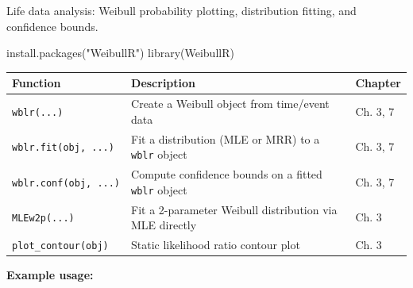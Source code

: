 \documentclass[
  letterpaper,
  DIV=11,
  numbers=noendperiod]{scrreprt}
\newenvironment{Shaded}{\begin{snugshade}}{\end{snugshade}}
\newcommand{\FunctionTok}[1]{\textcolor[rgb]{0.28,0.35,0.67}{#1}}
\newcommand{\NormalTok}[1]{\textcolor[rgb]{0.00,0.23,0.31}{#1}}
\newcommand{\StringTok}[1]{\textcolor[rgb]{0.13,0.47,0.30}{#1}}
\newcounter{none} %
\begin{document}
Life data analysis: Weibull probability plotting, distribution fitting,
and confidence bounds.

\begin{Shaded}
\begin{Highlighting}[]
\FunctionTok{install.packages}\NormalTok{(}\StringTok{"WeibullR"}\NormalTok{)}
\FunctionTok{library}\NormalTok{(WeibullR)}
\end{Highlighting}
\end{Shaded}

{\def\LTcaptype{none} %
\begin{longtable}[]{@{}
  >{\raggedright\arraybackslash}p{}
  >{\raggedright\arraybackslash}p{}
  >{\raggedright\arraybackslash}p{}@{}}
\toprule\noalign{}
\begin{minipage}[b]{\linewidth}\raggedright
Function
\end{minipage} & \begin{minipage}[b]{\linewidth}\raggedright
Description
\end{minipage} & \begin{minipage}[b]{\linewidth}\raggedright
Chapter
\end{minipage} \\
\midrule\noalign{}
\endhead
\bottomrule\noalign{}
\endlastfoot
\texttt{wblr(...)} & Create a Weibull object from time/event data & Ch.
3, 7 \\
\texttt{wblr.fit(obj,\ ...)} & Fit a distribution (MLE or MRR) to a
\texttt{wblr} object & Ch. 3, 7 \\
\texttt{wblr.conf(obj,\ ...)} & Compute confidence bounds on a fitted
\texttt{wblr} object & Ch. 3, 7 \\
\texttt{MLEw2p(...)} & Fit a 2-parameter Weibull distribution via MLE
directly & Ch. 3 \\
\texttt{plot\_contour(obj)} & Static likelihood ratio contour plot & Ch.
3 \\
\end{longtable}
}

\textbf{Example usage:}
\end{document}

